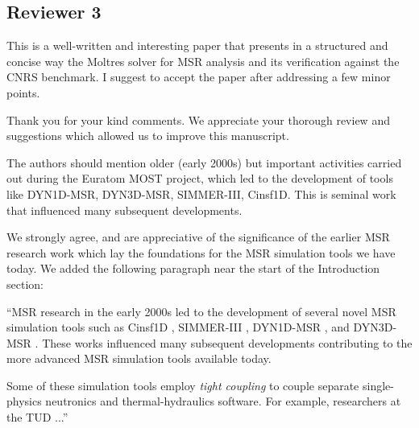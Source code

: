 \documentclass[answers,11pt]{exam}
\begin{document}
\begin{questions}

\section*{Reviewer 3}
        \question This is a well-written and interesting paper that presents in a structured and concise way the Moltres solver for MSR analysis and its verification against the CNRS benchmark. I suggest to accept the paper after addressing a few minor points.
        \begin{solution}
            Thank you for your kind comments. We appreciate your thorough
            review and suggestions which allowed us to improve this manuscript.
        \end{solution}
        \question The authors should mention older (early 2000s) but important
        activities carried out during the Euratom MOST project, which led to
        the development of tools like DYN1D-MSR, DYN3D-MSR, SIMMER-III,
        Cinsf1D. This is seminal work that influenced many subsequent developments.
        \begin{solution}
        	We strongly agree, and are appreciative of the significance of
        	the earlier MSR research work
        	which lay the foundations for the MSR simulation tools we have
        	today. We added the following paragraph near the start of the
        	Introduction section:
        	
        	``\gls{MSR} research in the early 2000s led to the development of several novel
\gls{MSR} simulation tools such as Cinsf1D \cite{lecarpentier_neutronic_2003},
SIMMER-III \cite{rineiski_kinetics_2005}, DYN1D-MSR
\cite{krepel_dyn1d-msr_2005}, and DYN3D-MSR \cite{krepel_dyn3d-msr_2007}. These
works influenced many subsequent developments contributing to the more advanced
\gls{MSR} simulation tools available today.

Some of these simulation tools employ \textit{tight coupling} to couple
separate single-physics neutronics and thermal-hydraulics software. For
example, researchers at the \gls{TUD} ...''
        \end{solution}


\end{questions}
\end{document}
